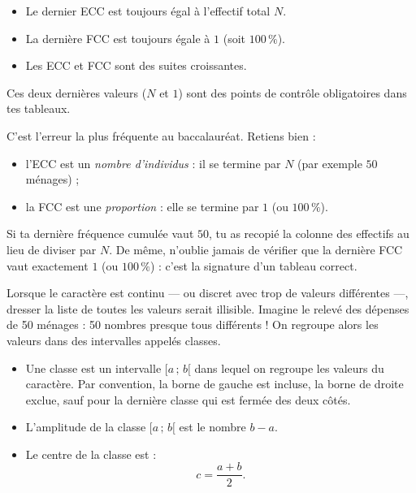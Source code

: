 \documentclass[11pt]{article}
\newcommand{\cle}[1]{{\popxbold\color{popdark}#1}}
\newcounter{popsec}
\newcounter{popsub}
\newcommand{\courssub}[1]{%
  \stepcounter{popsub}%
  \par\vspace{9pt}\noindent{\popxbold\fontsize{11.5}{13}\selectfont\color{popink}{\color{poporange}\thepopsec.\thepopsub}\hspace{6pt}#1}\par\nopagebreak\vspace{4pt}
}
\begin{document}
\begin{aretenir}
\begin{itemize}
\item Le dernier ECC est toujours égal à l'effectif total $N$.
\item La dernière FCC est toujours égale à $1$ (soit $100\,\%$).
\item Les ECC et FCC sont des suites croissantes.
\end{itemize}
Ces deux dernières valeurs ($N$ et $1$) sont des points de contrôle obligatoires dans tes tableaux.
\end{aretenir}

\begin{attention}
C'est l'erreur la plus fréquente au baccalauréat. Retiens bien :
\begin{itemize}
\item l'ECC est un \emph{nombre d'individus} : il se termine par $N$ (par exemple $50$ ménages) ;
\item la FCC est une \emph{proportion} : elle se termine par $1$ (ou $100\,\%$).
\end{itemize}
Si ta dernière fréquence cumulée vaut $50$, tu as recopié la colonne des effectifs au lieu de diviser par $N$. De même, n'oublie jamais de vérifier que la dernière FCC vaut exactement $1$ (ou $100\,\%$) : c'est la signature d'un tableau correct.
\end{attention}

\courssub{Regroupement en classes}

Lorsque le caractère est continu — ou discret avec trop de valeurs différentes —, dresser la liste de toutes les valeurs serait illisible. Imagine le relevé des dépenses de 50 ménages : 50 nombres presque tous différents ! On regroupe alors les valeurs dans des intervalles appelés \cle{classes}.

\begin{definition}
\begin{itemize}
\item Une \cle{classe} est un intervalle $[a\,;\,b[$ dans lequel on regroupe les valeurs du caractère. Par convention, la borne de gauche est incluse, la borne de droite exclue, sauf pour la dernière classe qui est fermée des deux côtés.
\item L'\cle{amplitude} de la classe $[a\,;\,b[$ est le nombre $b - a$.
\item Le \cle{centre} de la classe est :
\[ c = \frac{a + b}{2}. \]
\end{itemize}
\end{definition}
\end{document}

